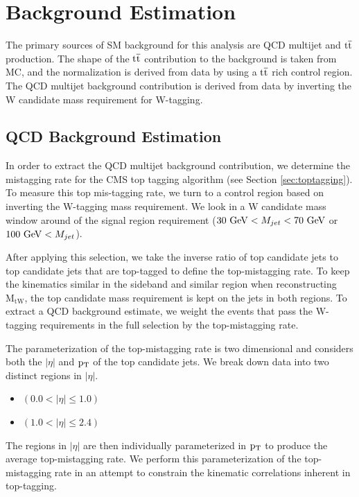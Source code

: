 \clearpage
\newpage
\section{Background Estimation}
\label{sec:bsbackgroundEstimation}
The primary sources of SM background for this analysis are QCD multijet and $\mathrm{t\overline{t}}$ production. 
The shape of the $\mathrm{t\overline{t}}$ contribution to the background is taken from MC, and the normalization is derived from data by using a $\mathrm{t\overline{t}}$ rich control region.  The QCD multijet 
background contribution is derived from data by inverting the W candidate mass requirement for W-tagging.

\subsection{QCD Background Estimation}
\label{sec:bssideband}
\label{sec:bsqcdBackgroundEstimationProcedure}
In order to extract the QCD multijet background contribution, we determine the mistagging rate for the CMS top tagging algorithm (see Section \ref{sec:toptagging}).  
To measure this top mis-tagging rate, we turn to a control region based on inverting the W-tagging mass requirement.  We look in a W candidate mass window around of the signal region 
requirement ($30~\mathrm{GeV} < M_{jet} < 70~\mathrm{GeV}$ or $100~\mathrm{GeV} < M_{jet}$). 

After applying this selection, we take the inverse ratio of top candidate jets to top candidate jets that are top-tagged to define the top-mistagging rate.  
To keep the kinematics similar in the sideband and similar region when reconstructing $\mathrm{M_{tW}}$, the top candidate mass requirement is kept on the jets in both regions.  
To extract a QCD background estimate, we weight the events that pass the W-tagging requirements in the full selection by the top-mistagging rate.

The parameterization of the top-mistagging rate is two dimensional and considers both the $|\eta|$ and $\mathrm{p_{T}}$ of the top candidate jets.  
We break down data into two distinct regions in $|\eta|$. 


\begin{itemize}
	\item {} $(0.0 < |\eta| \leq 1.0)$
	\item {} $(1.0 < |\eta| \leq 2.4)$ 
\end{itemize}

The regions in $|\eta|$ are then individually parameterized in $\mathrm{p_{T}}$ to produce the average top-mistagging rate.  We perform this parameterization 
of the top-mistagging rate in an attempt to constrain the kinematic correlations inherent in top-tagging.

